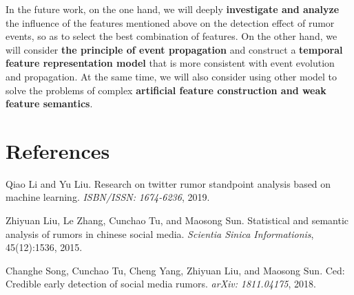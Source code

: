 \documentclass[12pt,a4paper]{article}
\begin{document}
In the future work, on the one hand, we will deeply \textbf{investigate and analyze} the influence of the features mentioned above on the detection effect of rumor events, so as to select the best combination of features. On the other hand, we will consider \textbf{the principle of event propagation} and construct a \textbf{temporal feature representation model} that is more consistent with event evolution and propagation. At the same time, we will also consider using other model to solve the problems of complex \textbf{artificial feature construction and weak feature semantics}.
\clearpage
\section{References}
\noindentpar[1] Qiao Li and Yu Liu. Research on twitter rumor standpoint analysis based on machine learning.
\textsl{ISBN/ISSN:}\textit{ 1674-6236}, 2019.

\noindentpar[2] Zhiyuan Liu, Le Zhang, Cunchao Tu, and Maosong Sun. Statistical and semantic analysis of rumors in
chinese social media. \textit{Scientia Sinica Informationis}, 45(12):1536, 2015.

\noindentpar[3] Changhe Song, Cunchao Tu, Cheng Yang, Zhiyuan Liu, and Maosong Sun. Ced: Credible early detection
of social media rumors. \textit{arXiv:} \textit{1811.04175}, 2018.
\end{document}
